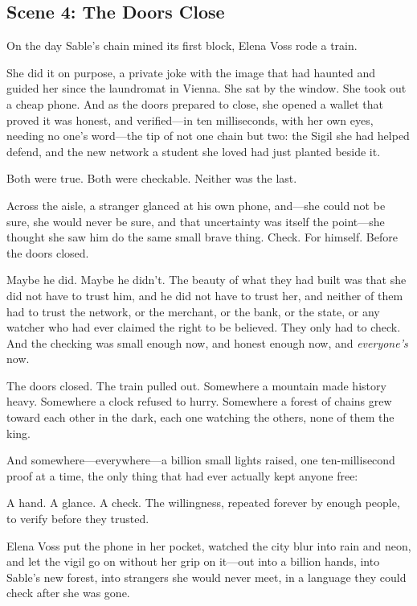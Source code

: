 \documentclass[12pt,letterpaper]{book}
\begin{document}
\hypertarget{scene-4-the-doors-close}{%
\subsection{Scene 4: The Doors
Close}\label{scene-4-the-doors-close}}

On the day Sable's chain mined its first block, Elena Voss rode a train.

She did it on purpose, a private joke with the image that had haunted and guided her
since the laundromat in Vienna. She sat by the window. She took out a cheap phone. And
as the doors prepared to close, she opened a wallet that proved it was honest, and
verified---in ten milliseconds, with her own eyes, needing no one's word---the tip of
not one chain but two: the Sigil she had helped defend, and the new network a student
she loved had just planted beside it.

Both were true. Both were checkable. Neither was the last.

Across the aisle, a stranger glanced at his own phone, and---she could not be sure, she
would never be sure, and that uncertainty was itself the point---she thought she saw
him do the same small brave thing. Check. For himself. Before the doors closed.

Maybe he did. Maybe he didn't. The beauty of what they had built was that she did not
have to trust him, and he did not have to trust her, and neither of them had to trust
the network, or the merchant, or the bank, or the state, or any watcher who had ever
claimed the right to be believed. They only had to check. And the checking was small
enough now, and honest enough now, and \emph{everyone's} now.

The doors closed. The train pulled out. Somewhere a mountain made history heavy.
Somewhere a clock refused to hurry. Somewhere a forest of chains grew toward each
other in the dark, each one watching the others, none of them the king.

And somewhere---everywhere---a billion small lights raised, one ten-millisecond proof
at a time, the only thing that had ever actually kept anyone free:

A hand. A glance. A check. The willingness, repeated forever by enough people, to
verify before they trusted.

Elena Voss put the phone in her pocket, watched the city blur into rain and neon, and
let the vigil go on without her grip on it---out into a billion hands, into Sable's new
forest, into strangers she would never meet, in a language they could check after she
was gone.
\end{document}
